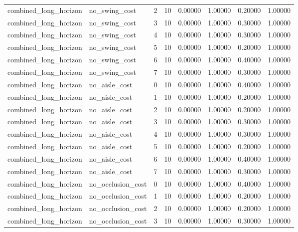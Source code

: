 \documentclass{article}
\begin{document}
\begin{table}[tbp]
{\begin{tabular}{llllllll}
combined\_long\_horizon & no\_swing\_cost & 2 & 10 & 0.00000 & 1.00000 & 0.20000 & 1.00000 \\
combined\_long\_horizon & no\_swing\_cost & 3 & 10 & 0.00000 & 1.00000 & 0.30000 & 1.00000 \\
combined\_long\_horizon & no\_swing\_cost & 4 & 10 & 0.00000 & 1.00000 & 0.30000 & 1.00000 \\
combined\_long\_horizon & no\_swing\_cost & 5 & 10 & 0.00000 & 1.00000 & 0.20000 & 1.00000 \\
combined\_long\_horizon & no\_swing\_cost & 6 & 10 & 0.00000 & 1.00000 & 0.40000 & 1.00000 \\
combined\_long\_horizon & no\_swing\_cost & 7 & 10 & 0.00000 & 1.00000 & 0.30000 & 1.00000 \\
combined\_long\_horizon & no\_aisle\_cost & 0 & 10 & 0.00000 & 1.00000 & 0.40000 & 1.00000 \\
combined\_long\_horizon & no\_aisle\_cost & 1 & 10 & 0.00000 & 1.00000 & 0.20000 & 1.00000 \\
combined\_long\_horizon & no\_aisle\_cost & 2 & 10 & 0.00000 & 1.00000 & 0.20000 & 1.00000 \\
combined\_long\_horizon & no\_aisle\_cost & 3 & 10 & 0.00000 & 1.00000 & 0.30000 & 1.00000 \\
combined\_long\_horizon & no\_aisle\_cost & 4 & 10 & 0.00000 & 1.00000 & 0.30000 & 1.00000 \\
combined\_long\_horizon & no\_aisle\_cost & 5 & 10 & 0.00000 & 1.00000 & 0.20000 & 1.00000 \\
combined\_long\_horizon & no\_aisle\_cost & 6 & 10 & 0.00000 & 1.00000 & 0.40000 & 1.00000 \\
combined\_long\_horizon & no\_aisle\_cost & 7 & 10 & 0.00000 & 1.00000 & 0.30000 & 1.00000 \\
combined\_long\_horizon & no\_occlusion\_cost & 0 & 10 & 0.00000 & 1.00000 & 0.40000 & 1.00000 \\
combined\_long\_horizon & no\_occlusion\_cost & 1 & 10 & 0.00000 & 1.00000 & 0.20000 & 1.00000 \\
combined\_long\_horizon & no\_occlusion\_cost & 2 & 10 & 0.00000 & 1.00000 & 0.20000 & 1.00000 \\
combined\_long\_horizon & no\_occlusion\_cost & 3 & 10 & 0.00000 & 1.00000 & 0.30000 & 1.00000 \\
\bottomrule
\end{tabular}
}
\end{table}

\clearpage
\end{document}
